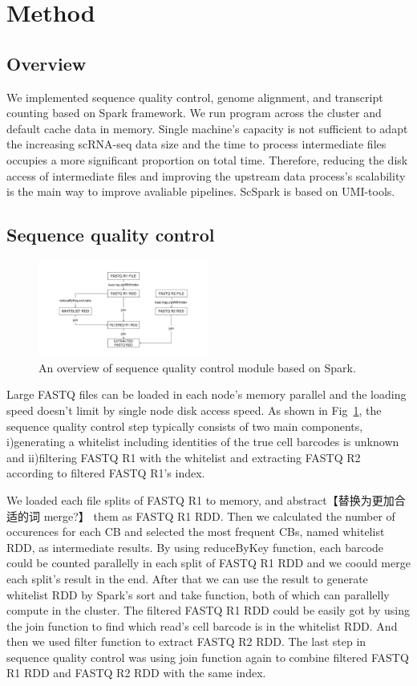 \documentclass[conference]{IEEEtran}
\begin{document}
\section{Method}
\subsection{Overview}
We implemented sequence quality control, genome alignment, and transcript counting based on Spark framework. 
We run program across the cluster and default cache data in memory. 
Single machine's capacity is not sufficient to adapt the increasing scRNA-seq data size and the time to process intermediate files occupies a more significant proportion on total time. 
Therefore, reducing the disk access of intermediate files and improving the upstream data process's scalability is the main way to improve avaliable pipelines. 
ScSpark is based on UMI-tools.
\subsection{Sequence quality control}
\begin{figure}
  \includegraphics[width=0.5\textwidth]{fig1.pdf}
  \caption{An overview of sequence quality control module based on Spark.} \label{fig1}
\end{figure} 

Large FASTQ files can be loaded in each node's memory parallel and the loading speed doesn't limit by single node disk access speed. 
As shown in Fig~\ref{fig1}, the sequence quality control step typically consists of two main components, i)generating a whitelist including identities of the true cell barcodes is unknown and ii)filtering FASTQ R1 with the whitelist and extracting FASTQ R2 according to filtered FASTQ R1's index.

We loaded each file splits of FASTQ R1 to memory, and abstract【替换为更加合适的词 merge?】 them as FASTQ R1 RDD. 
Then we calculated the number of occurences for each CB and selected the most frequent CBs, named whitelist RDD, as intermediate results. 
By using reduceByKey function, each barcode could be counted parallelly in each split of FASTQ R1 RDD and we coould merge each split's result in the end. 
After that we can use the result to generate whitelist RDD by Spark's sort and take function, both of which can parallelly compute in the cluster. 
The filtered FASTQ R1 RDD could be easily got by using the join function to find which read's cell barcode is in the whitelist RDD. 
And then we used filter function to extract FASTQ R2 RDD. 
The last step in sequence quality control was using join function again to combine filtered FASTQ R1 RDD and FASTQ R2 RDD with the same index. 
\end{document}

